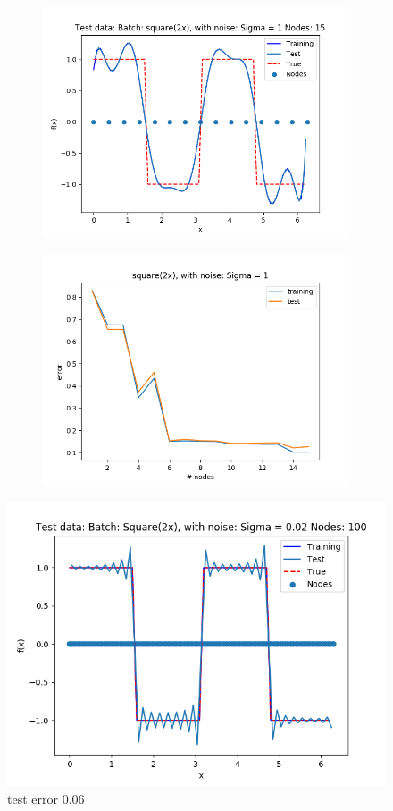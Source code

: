 \documentclass{article}
\begin{document}
\begin{figure}[ht!]
\begin{subfigure}[t]{0.4\textwidth}
        \includegraphics[width=1\textwidth]{plots/batch/best_square2x.png}
        \caption{}
    \end{subfigure}
    \begin{subfigure}[t]{0.4\textwidth}
        \centering
        \includegraphics[width=1\textwidth]{plots/batch/best_square2x_error.png}
        \caption{}
    \end{subfigure}
\end{figure}

\begin{figure}[ht!]
  \centering
  \includegraphics[width=0.5\linewidth]{plots/batch/best_square2x_extreme}
  \caption{test error 0.06}
  \label{}
\end{figure}
\end{document}
